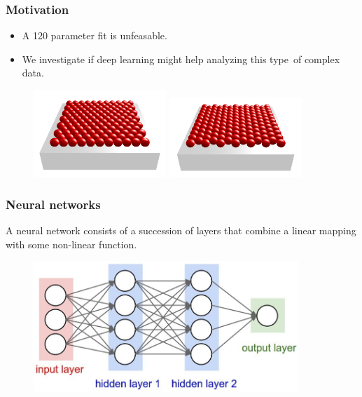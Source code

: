 \documentclass{beamer}
\begin{document}
\begin{frame}
    \frametitle{Motivation}
    \begin{itemize}
        \item A 120 parameter fit is unfeasable.
        \item We investigate if deep learning might help analyzing this type\
              of complex data.
    \end{itemize}
    \begin{figure}
        \includegraphics[width=5cm]{orient_1.png}
        \includegraphics[width=5cm]{orient_2.png}
    \end{figure}
\end{frame}

\begin{frame}
    \frametitle{Neural networks}
    A neural network consists of a succession of layers that combine a linear
    mapping with some non-linear function.
    \begin{figure}
        \includegraphics[width=10cm]{neural_network.jpg}
    \end{figure}
\end{frame}
\end{document}
